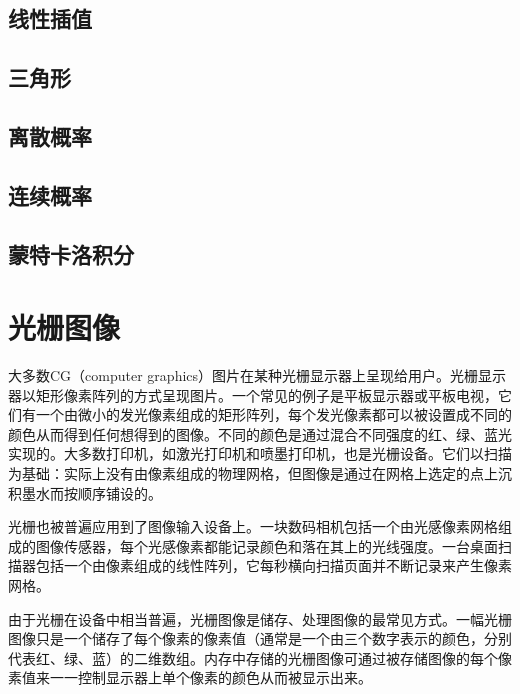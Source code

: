 \documentclass[lang=cn,12pt]{elegantbook}
\begin{document}
\section{线性插值}

\section{三角形}

\section{离散概率}

\section{连续概率}

\section{蒙特卡洛积分}

\chapter{光栅图像}
 
大多数CG（computer graphics）图片在某种光栅显示器上呈现给用户。光栅显示器以矩形像素阵列的方式呈现图片。一个常见的例子是平板显示器或平板电视，它们有一个由微小的发光像素组成的矩形阵列，每个发光像素都可以被设置成不同的颜色从而得到任何想得到的图像。不同的颜色是通过混合不同强度的红、绿、蓝光实现的。大多数打印机，如激光打印机和喷墨打印机，也是光栅设备。它们以扫描为基础：实际上没有由像素组成的物理网格，但图像是通过在网格上选定的点上沉积墨水而按顺序铺设的。



光栅也被普遍应用到了图像输入设备上。一块数码相机包括一个由光感像素网格组成的图像传感器，每个光感像素都能记录颜色和落在其上的光线强度。一台桌面扫描器包括一个由像素组成的线性阵列，它每秒横向扫描页面并不断记录来产生像素网格。

由于光栅在设备中相当普遍，光栅图像是储存、处理图像的最常见方式。一幅光栅图像只是一个储存了每个像素的像素值（通常是一个由三个数字表示的颜色，分别代表红、绿、蓝）的二维数组。内存中存储的光栅图像可通过被存储图像的每个像素值来一一控制显示器上单个像素的颜色从而被显示出来。

\end{document}
